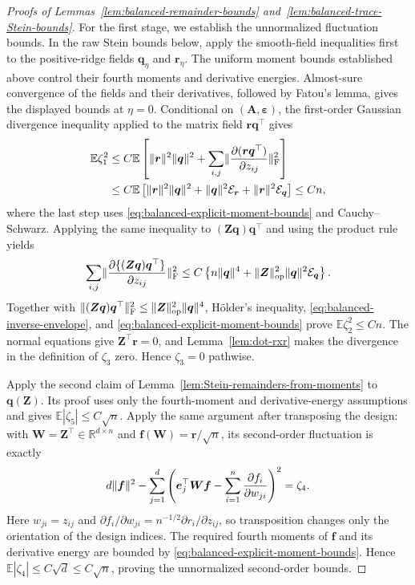 \documentclass{article}
\theoremstyle{plain}
\theoremstyle{definition}
\theoremstyle{definition}
\DeclarePairedDelimiter\norm{\lVert}{\rVert}
\def\R{{\mathbb{R}}}
\def\E{{\mathbb{E}}}
\def\mathbold{\boldsymbol}
\def\cal{\mathcal}
\def\bA{\mathbold{A}}\def\calA{{\cal A}}\def\scrA{{\mathscr A}}\def\Ahat{\widehat{A}}\def\Atil{{\widetilde A}}
\def\bff{\mathbold{f}}\def\fhat{\widehat{f}}\def\hf{\widehat{f}}\def\ftil{\widetilde{f}}
\def\bq{\mathbold{q}}\def\qhat{\widehat{q}}\def\qtil{\widetilde{q}}\def\qbar{{\overline q}}
\def\br{\mathbold{r}}\def\rhat{\widehat{r}}\def\rtil{\widetilde{r}}\def\rbar{{\overline r}}
\def\be{\mathbold{e}}
\def\bW{\mathbold{W}}\def\hbW{{\widehat{\bW}}}\def\tbW{{\widetilde{\bW}}}
\def\bZ{\mathbold{Z}}\def\hbZ{{\widehat{\bZ}}}\def\tbZ{{\widetilde{\bZ}}}
\def\ep{\varepsilon}\def\eps{\epsilon}\def\veps{\varepsilon}
\def\bep{ {\mathbold{\ep} }}
\begin{document}
\begin{proof}[Proofs of Lemmas~\ref{lem:balanced-remainder-bounds}
and~\ref{lem:balanced-trace-Stein-bounds}]
For the first stage, we establish the unnormalized fluctuation bounds.
In the raw Stein bounds below, apply the smooth-field inequalities first to
the positive-ridge fields $\bq_\eta$ and $\br_\eta$. The uniform moment
bounds established above control their fourth moments and derivative
energies. Almost-sure convergence of the fields and their derivatives,
followed by Fatou's lemma, gives the displayed bounds at $\eta=0$.
Conditional on $(\bA,\bep)$, the first-order Gaussian divergence
inequality applied to the matrix field $\br\bq^\top$ gives
\begin{align*}
    \E\zeta_1^2
    &\leq C\E\left[
       \norm{\br}^2\norm{\bq}^2
       +\sum_{i,j}
          \norm{\pdv{(\br\bq^\top)}{z_{ij}}}_{\rm F}^2
    \right]\\
    &\leq C\E\left[
       \norm{\br}^2\norm{\bq}^2
       +\norm{\bq}^2\calE_{\br}
       +\norm{\br}^2\calE_{\bq}
    \right]
    \leq Cn,
\end{align*}
where the last step uses \eqref{eq:balanced-explicit-moment-bounds} and
Cauchy--Schwarz.  Applying the same inequality to
$(\bZ\bq)\bq^\top$ and using the product rule yields
\begin{align*}
    \sum_{i,j}
       \norm{\pdv{\{(\bZ\bq)\bq^\top\}}{z_{ij}}}_{\rm F}^2
    \leq C\left\{
       n\norm{\bq}^4
       +\norm{\bZ}_{\rm op}^2\norm{\bq}^2\calE_{\bq}
    \right\}.
\end{align*}
Together with
$\norm{(\bZ\bq)\bq^\top}_{\rm F}^2
 \leq\norm{\bZ}_{\rm op}^2\norm{\bq}^4$,
H\"older's inequality, \eqref{eq:balanced-inverse-envelope}, and
\eqref{eq:balanced-explicit-moment-bounds} prove
$\E\zeta_2^2\leq Cn$.  The normal equations give
$\bZ^\top\br=0$, and Lemma~\ref{lem:dot-rxr} makes the
divergence in the definition of $\zeta_3$ zero.  Hence $\zeta_3=0$ pathwise.

Apply the second claim of
Lemma~\ref{lem:Stein-remainders-from-moments} to $\bq(\bZ)$.  Its proof uses
only the fourth-moment and derivative-energy assumptions and gives
$\E|\zeta_5|\leq C\sqrt n$.  Apply the same argument
after transposing the design: with $\bW=\bZ^\top\in\R^{d\times n}$ and
$\bff(\bW)=\br/\sqrt n$, its second-order fluctuation is exactly
\begin{align*}
    d\norm{\bff}^2
    -\sum_{j=1}^d\left(
       \be_j^\top\bW\bff
       -\sum_{i=1}^n\pdv{f_i}{w_{ji}}
    \right)^2
    =\zeta_4.
\end{align*}
Here $w_{ji}=z_{ij}$ and
$\partial f_i/\partial w_{ji}
=n^{-1/2}\partial r_i/\partial z_{ij}$, so transposition
changes only the orientation of the design indices.
The required fourth moments of $\bff$ and its derivative energy are bounded
by \eqref{eq:balanced-explicit-moment-bounds}.  Hence
$\E|\zeta_4|\leq C\sqrt d\leq C\sqrt n$, proving the unnormalized
second-order bounds.


\end{proof}
\end{document}
